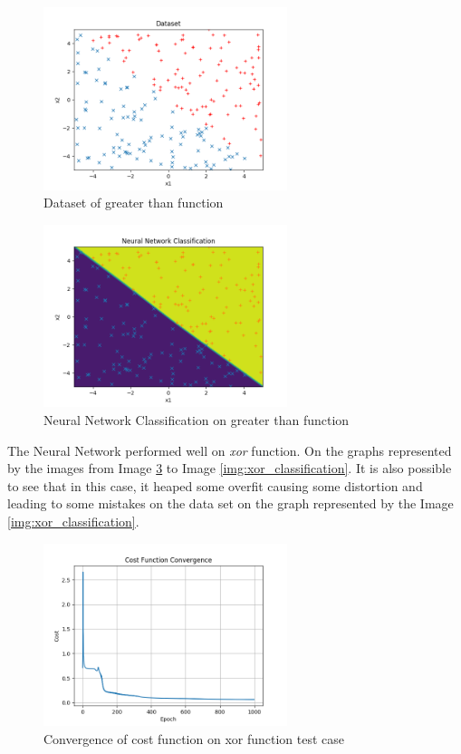 \documentclass[journal]{IEEEtran}
\begin{document}
\begin{figure}
  \begin{center}
  \includegraphics[width=2.8in]{./../code/result_greater_than/dataset.png}
  \caption{Dataset of greater than function}
  \label{img:greater_data_set}
  \end{center}
\end{figure}

\begin{figure}
  \begin{center}
  \includegraphics[width=2.8in]{./../code/result_greater_than/neural_net_classification.png}
  \caption{Neural Network Classification on greater than function}
  \label{img:greater_classification}
  \end{center}
\end{figure}

The Neural Network performed well on \textit{xor} function. On the graphs represented by the images from Image \ref{img:xor_cost} to Image \ref{img:xor_classification}. It is also possible to see that in this case, it heaped some overfit causing some distortion and leading to some mistakes on the data set on the graph represented by the Image \ref{img:xor_classification}.

\begin{figure}
  \begin{center}
  \includegraphics[width=2.8in]{./../code/result_xor/cost_function_convergence.png}
  \caption{Convergence of cost function on xor function test case}
  \label{img:xor_cost}
  \end{center}
\end{figure}
\end{document}
